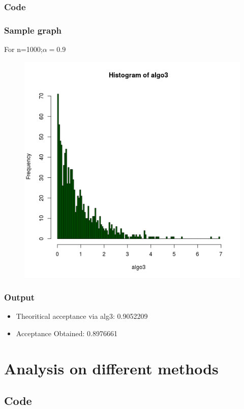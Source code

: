\documentclass[11pt]{article}
\begin{document}
\subsubsection{Code}

\subsubsection{Sample graph}
For n=1000;$\alpha=0.9$
\begin{figure}[H]
\centering
\includegraphics[scale=.65]{image5}
\end{figure}
\subsubsection{Output}
\begin{itemize}
\item Theoritical acceptance via alg3: 0.9052209 
\item Acceptance Obtained: 0.8976661   
\end{itemize}
\section{Analysis on different methods}
\subsection{Code}

\end{document}
